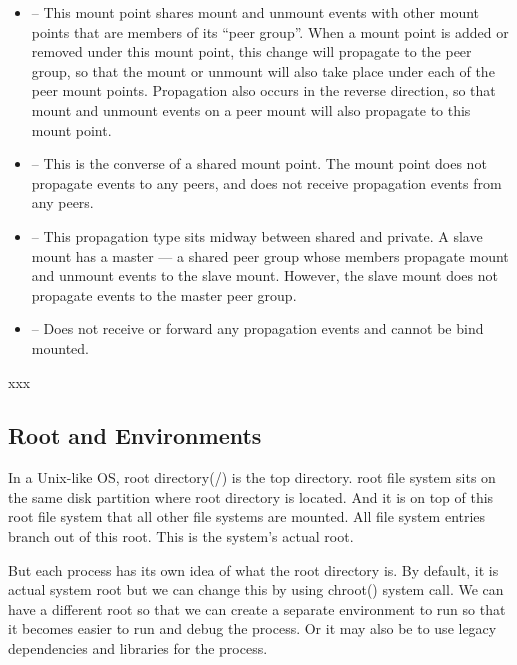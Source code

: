 \begin{itemize}
	\item {} --  This mount point shares mount and unmount events with other mount points that 
		are members of its “peer group”. When a mount point is added or removed under this mount point, 
		this change will propagate to the peer group, so that the mount or unmount will also take place under 
		each of the peer mount points. Propagation also occurs in the reverse direction, so that mount and 
		unmount events on a peer mount will also propagate to this mount point.
	\item {} -- This is the converse of a shared mount point. The mount point does not propagate 
		events to any peers, and does not receive propagation events from any peers.
	\item {} -- This propagation type sits midway between shared and private. A slave mount has a 
		master — a shared peer group whose members propagate mount and unmount events to the slave mount. 
		However, the slave mount does not propagate events to the master peer group.
	\item {} -- Does not receive or forward any propagation events and cannot be bind mounted.
\end{itemize}

\noindent
xxx
	

\subsection{Root and  Environments}

In a Unix-like OS, root directory(/) is the top directory. root file system sits on the same disk partition where root directory is located. And it is on top of this root file system that all other file systems are mounted. All file system entries branch out of this root. This is the system’s actual root.

But each process has its own idea of what the root directory is. By default, it is actual system root but we can change this by using chroot() system call. We can have a different root so that we can create a separate environment to run so that it becomes easier to run and debug the process. Or it may also be to use legacy dependencies and libraries for the process.

